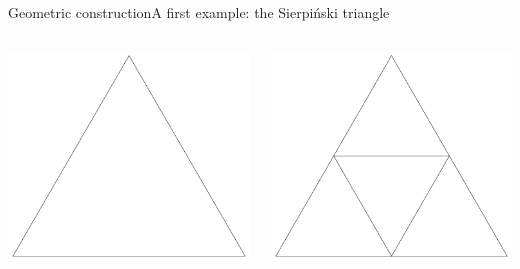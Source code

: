 \documentclass[xcolor=x11names,compress,professionalfonts]{beamer}
\renewcommand{\(}{\begin{columns}}
\renewcommand{\)}{\end{columns}}
\newcommand{\<}[1]{\begin{column}{#1}}
\renewcommand{\>}{\end{column}}
\begin{document}
\begin{frame}{Geometric construction}{A first example: the Sierpiński triangle}

\begin{itemize} 

\begin{columns}
\newcommand{\s}{.2}
  \begin{column}{3cm}
    \includegraphics[scale=\s]{sierpinski0.pdf}
  \end{column}

  \begin{column}{3cm}
     \includegraphics[scale=\s]{sierpinski1.pdf}
  \end{column}
  

\end{columns}
\end{itemize}
\end{frame}
\end{document}
